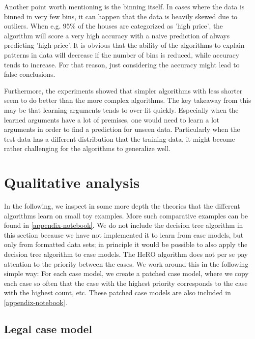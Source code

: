 Another point worth mentioning is the binning itself. In cases where the data is binned in very few bins, it can happen that the data is heavily skewed due to outliers. When e.g. 95\% of the houses are categorized as 'high price', the algorithm will score a very high accuracy with a naive prediction of always predicting 'high price'. It is obvious that the ability of the algorithms to explain patterns in data will decrease if the number of bins is reduced, while accuracy tends to increase. For that reason, just considering the accuracy might lead to false conclusions. 

Furthermore, the experiments showed that simpler algorithms with less shorter seem to do better than the more complex algorithms. The key takeaway from this may be that learning arguments tends to over-fit quickly. Especially when the learned arguments have a lot of premises, one would need to learn a lot arguments in order to find a prediction for unseen data. Particularly when the test data has a different distribution that the training data, it might become rather challenging for the algorithms to generalize well. 


\section{Qualitative analysis}

In the following, we inspect in some more depth the theories that the different algorithms learn on small toy examples. More such comparative examples can be found in \autoref{appendix-notebook}. We do not include the decision tree algorithm in this section because we have not implemented it to learn from case models, but only from formatted data sets; in principle it would be possible to also apply the decision tree algorithm to case models. The HeRO algorithm does not per se pay attention to the priority between the cases. We work around this in the following simple way: For each case model, we create a patched case model, where we copy each case so often that the case with the highest priority corresponds to the case with the highest count, etc. These patched case models are also included in \autoref{appendix-notebook}.

\subsection*{Legal case model}

